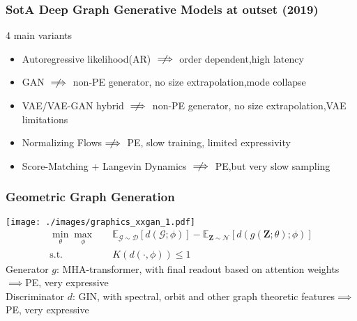 \documentclass[./presentation.tex]{subfiles}
\begin{document}
\begin{frame}[label=working]
  \frametitle{SotA Deep Graph Generative Models at outset (2019)}
  \small
  4 main variants
  \begin{itemize}
    \item Autoregressive likelihood(AR) $\centernot\implies$ order dependent,high latency%
    \item GAN %
      $\centernot\implies$ non-PE generator, no size extrapolation,mode collapse
    \item VAE/VAE-GAN hybrid%
      $\centernot\implies$ non-PE generator, no size extrapolation,VAE limitations %
    \item Normalizing Flows$\centernot\implies$ PE, slow training, limited expressivity
    \item Score-Matching + Langevin Dynamics  $\centernot\implies$ PE,but very slow sampling
  \end{itemize}
\end{frame}

\begin{frame}[label=working,t]
  \frametitle{Geometric Graph Generation}
  \texttt{[image: ./images/graphics\_xxgan\_1.pdf]}
  \vspace{-0.5cm}
  \begin{align}
    \min_{\theta}\max_{\phi}&\quad\mathbb{E}_{\mathcal{G}\sim \mathcal{D}}\left[d\left(\mathcal{G};\phi\right)\right]-\mathbb{E}_{\mathbf{Z}\sim \mathcal{N}}\left[d\left(g(\mathbf{Z};\theta);\phi\right)\right]\nonumber\\
    \text{s.t.}&\quad K\left(d\left(\cdot,\phi\right)\right)\leq 1\nonumber
  \end{align}
  \vspace{-0.25cm}
  Generator $g$: MHA-transformer, with final readout based on attention weights$\implies$PE, very expressive\\
  Discriminator $d$: GIN, with spectral, orbit and other graph theoretic features$\implies$PE, very expressive
\end{frame}
\end{document}
